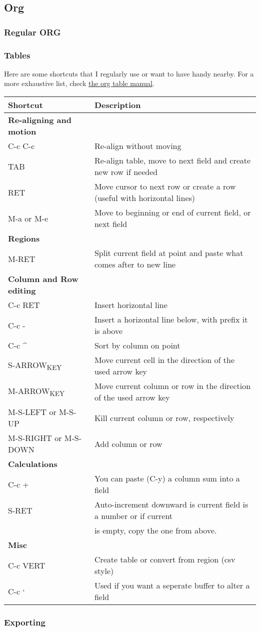\documentclass[11pt]{article}
\begin{document}
\subsection{Org}
\label{sec:orgdfbc3f0}
\subsubsection{Regular ORG}
\label{sec:orgaf28c34}
\subsubsection{Tables}
\label{sec:org5318f72}
Here are some shortcuts that I regularly use or want to have handy nearby. For a more exhaustive list, check \href{https://orgmode.org/manual/Built\_002din-Table-Editor.html\#Built\_002din-Table-Editor}{the org table manual}.

\begin{center}
\begin{tabular}{ll}
\hline
Shortcut & Description\\
\hline
\textbf{Re-aligning and motion} & \\
\hline
C-c C-c & Re-align without moving\\
TAB & Re-align table, move to next field and create new row if needed\\
RET & Move cursor to next row or create a row (useful with horizontal lines)\\
M-a or M-e & Move to beginning or end of current field, or next field\\
\hline
\textbf{Regions} & \\
\hline
M-RET & Split current field at point and paste what comes after to new line\\
\hline
\textbf{Column and Row editing} & \\
\hline
C-c RET & Insert horizontal line\\
C-c - & Insert a horizontal line below, with prefix it is above\\
C-c \^{} & Sort by column on point\\
S-ARROW\textsubscript{KEY} & Move current cell in the direction of the used arrow key\\
M-ARROW\textsubscript{KEY} & Move current column or row in the direction of the used arrow key\\
M-S-LEFT or M-S-UP & Kill current column or row, respectively\\
M-S-RIGHT or M-S-DOWN & Add column or row\\
\hline
\textbf{Calculations} & \\
\hline
C-c + & You can paste (C-y) a column sum into a field\\
S-RET & Auto-increment downward is current field is a number or if current\\
 & is empty, copy the one from above.\\
\hline
\textbf{Misc} & \\
\hline
C-c VERT & Create table or convert from region (csv style)\\
C-c ` & Used if you want a seperate buffer to alter a field\\
\hline
\end{tabular}
\end{center}
\subsubsection{Exporting}
\label{sec:orga3fb191}
\end{document}
